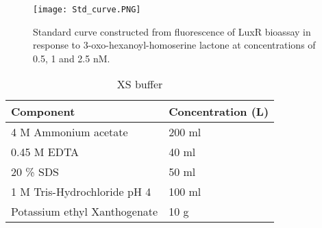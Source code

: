 \documentclass[twoside]{article}
\begin{document}
\begin{figure}
\texttt{[image: Std\_curve.PNG]}
\caption{Standard curve constructed from fluorescence of LuxR bioassay in response to 3-oxo-hexanoyl-homoserine lactone at concentrations of 0.5, 1 and 2.5 nM.}
\end{figure}
\FloatBarrier

\begin{table}
\caption{XS buffer}
\begin{tabular}{  p{6.9cm} | p{6.9cm}  }
\hline
Component & Concentration (L) \\
\hline
 4 M Ammonium acetate & 200 ml  \\
  0.45 M EDTA  & 40 ml \\
    20 \% SDS  & 50 ml \\
    1 M Tris-Hydrochloride pH 4    & 100 ml  \\
        Potassium ethyl Xanthogenate  & 10 g  \\
  \hline
\end{tabular}
\end{table}
\end{document}
